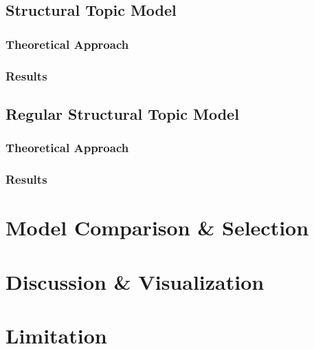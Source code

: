 \documentclass[9pt,notitlepage]{article}		%
\begin{document}
\subsection{Structural Topic Model}

\subsubsection*{Theoretical Approach}
\subsubsection*{Results}

\subsection{Regular Structural Topic Model}

\subsubsection*{Theoretical Approach}
\subsubsection*{Results}

\section{Model Comparison \& Selection}

\section{Discussion \& Visualization}

\section{Limitation}
\end{document}
